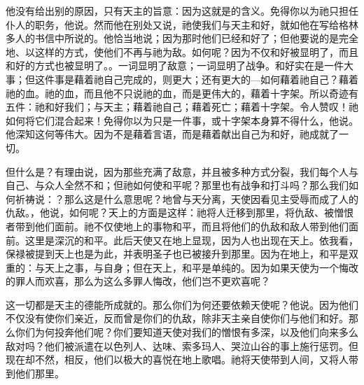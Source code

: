 他没有给出别的原因，只有天主的旨意：因为这就是的含义。免得你以为祂只担任仆人的职务，他说。然而他在别处又说，祂使我们与天主和好，就如他在写给格林多人的书信中所说的。他恰当地说；因为那时他们已经和好了；但他要说的是完全地、以这样的方式，使他们不再与祂为敌。如何呢？因为不仅和好被显明了，而且和好的方式也被显明了。。一词显明了敌意；一词显明了战争。和好实在是一件大事；但这件事是藉着祂自己完成的，则更大；还有更大的—如何藉着祂自己？藉着祂的血。祂的血，而且他不只说祂的血，而是更伟大的，藉着十字架。所以奇迹有五件：祂和好我们；与天主；藉着祂自己；藉着死亡；藉着十字架。令人赞叹！祂如何将它们混合起来！免得你以为只是一件事，或十字架本身算不得什么，他说。他深知这何等伟大。因为不是藉着言语，而是藉着献出自己为和好，祂成就了一切。\par

但什么是？有理由说，因为那些充满了敌意，并且被多种方式分裂，我们每个人与自己、与众人全然不和；但祂如何使和平呢？那里也有战争和打斗吗？那么我们如何祈祷说：？那么这是什么意思呢？地曾与天分离，天使因看见主受辱而成了人的仇敌。，他说，如何呢？天上的方面是这样：祂将人迁移到那里，将仇敌、被憎恨者带到他们面前。祂不仅使地上的事物和平，而且将他们的仇敌和敌人带到他们面前。这里是深沉的和平。此后天使又在地上显现，因为人也出现在天上。依我看，保禄被提到天上也是为此，并表明圣子也已被接升到那里。因为在地上，和平是双重的：与天上之事，与自身；但在天上，和平是单纯的。因为如果天使为一个悔改的罪人而欢喜，那么为这么多罪人悔改，他们岂不更欢喜呢？\par

这一切都是天主的德能所成就的。那么你们为何还要依赖天使呢？他说。因为他们不仅没有使你们亲近，反而曾是你们的仇敌，除非天主亲自使你们与他们和好。那么你们为何投奔他们呢？你们要知道天使对我们的憎恨有多深，以及他们向来多么敌对吗？他们被派遣在以色列人、达味、索多玛人、哭泣山谷的事上施行惩罚。但现在却不然，相反，他们以极大的喜悦在地上歌唱。祂将天使带到人间，又将人带到他们那里。\par

